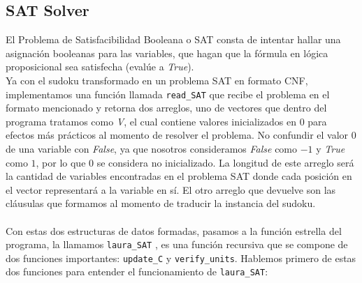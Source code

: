 \documentclass[letterpaper,12pt]{article}
\begin{document}
\subsection{SAT Solver}

El Problema de Satisfacibilidad Booleana o SAT consta de intentar hallar una asignación booleanas para las variables, que hagan que la fórmula en lógica proposicional sea satisfecha (evalúe a \textit{True}).\\

Ya con el sudoku transformado en un problema SAT en formato CNF, implementamos una función llamada \texttt{read\_SAT} que recibe el problema en el formato mencionado y retorna dos arreglos, uno de vectores que dentro del programa tratamos como \textit{V}, el cual contiene valores inicializados en $0$ para efectos más prácticos al momento de resolver el problema. No confundir el valor $0$ de una variable con \textit{False}, ya que nosotros consideramos \textit{False} como $-1$ y \textit{True} como $1$, por lo que $0$ se considera no inicializado. La longitud de este arreglo será la cantidad de variables encontradas en el problema SAT donde cada posición en el vector representará a la variable en sí. El otro arreglo que devuelve son las cláusulas que formamos al momento de traducir la instancia del sudoku.\\
\\
Con estas dos estructuras de datos formadas, pasamos a la función estrella del programa, la llamamos \texttt{laura\_SAT} \Cooley, es una función recursiva que se compone de dos funciones importantes: \texttt{update\_C} y \texttt{verify\_units}. Hablemos primero de estas dos funciones para entender el funcionamiento de \texttt{laura\_SAT}:\\
\end{document}
